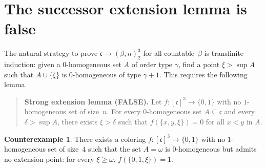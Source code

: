 \documentclass[11pt]{article}
\theoremstyle{definition}
\newtheorem{counterexample}[theorem]{Counterexample}
\theoremstyle{remark}
\newcommand{\cc}{\mathfrak{c}}
\begin{document}
\section{The successor extension lemma is false}

The natural strategy to prove $\cc\to(\beta,n)^3_2$ for all countable~$\beta$ is transfinite induction: given a $0$-homogeneous set $A$ of order type $\gamma$, find a point $\xi>\sup A$ such that $A\cup\{\xi\}$ is $0$-homogeneous of type $\gamma+1$. This requires the following lemma.

\begin{quote}
\textbf{Strong extension lemma (FALSE).}
Let $f:[\cc]^3\to\{0,1\}$ with no $1$-homogeneous set of size~$n$. For every $0$-homogeneous set $A\subseteq\cc$ and every $\delta>\sup A$, there exists $\xi>\delta$ such that $f(\{x,y,\xi\})=0$ for all $x<y$ in $A$.
\end{quote}

\begin{counterexample}
\label{cex:extension}
There exists a coloring $f:[\cc]^3\to\{0,1\}$ with no $1$-homogeneous set of size~$4$ such that the set $A=\omega$ is $0$-homogeneous but admits no extension point: for every $\xi\ge\omega$, $f(\{0,1,\xi\})=1$.
\end{counterexample}
\end{document}
